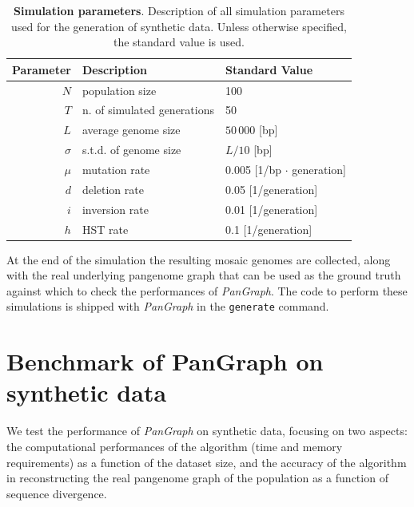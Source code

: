 \documentclass[aps,rmp,reprint,superscriptaddress,notitlepage,10pt,onecolumn]{revtex4-1}
\begin{document}
\begin{table}[hb]
    \setlength{\tabcolsep}{9pt}
    \begin{tabular}{r l l}
        \hline\hline
        Parameter & Description                 & Standard Value                  \\
        \hline
        $N$       & population size             & 100                             \\
        $T$       & n. of simulated generations & 50                              \\
        $L$       & average genome size         & $50\, 000$ [bp]                 \\
        $\sigma$  & s.t.d. of genome size       & $L/10$ [bp]                     \\
        $\mu$     & mutation rate               & 0.005 [1/bp $\cdot$ generation] \\
        $d$       & deletion rate               & 0.05 [1/generation]             \\
        $i$       & inversion rate              & 0.01 [1/generation]             \\
        $h$       & HST rate                    & 0.1 [1/generation]              \\
        \hline
    \end{tabular}
    \caption{{\bf Simulation parameters}. Description of all simulation parameters used for the generation of synthetic data. Unless otherwise specified, the standard value is used.}
    \label{table:sim-params}
\end{table}

At the end of the simulation the resulting mosaic genomes are collected, along with the real underlying pangenome graph that can be used as the ground truth against which to check the performances of \textit{PanGraph}. The code to perform these simulations is shipped with \textit{PanGraph} in the \verb|generate| command.

\section{Benchmark of PanGraph on synthetic data}

We test the performance of \textit{PanGraph} on synthetic data, focusing on two aspects: the computational performances of the algorithm (time and memory requirements) as a function of the dataset size, and the accuracy of the algorithm in reconstructing the real pangenome graph of the population as a function of sequence divergence.
\end{document}

